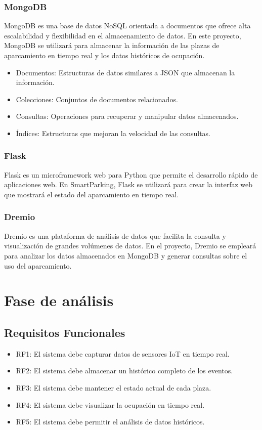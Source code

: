 \documentclass{../../../miPlantilla}
\begin{document}
\subsubsection{MongoDB}
MongoDB es una base de datos NoSQL orientada a documentos que ofrece alta escalabilidad y flexibilidad en el almacenamiento de datos.
En este proyecto, MongoDB se utilizará para almacenar la información de las plazas de aparcamiento en tiempo real y los datos históricos
de ocupación.

\begin{itemize}
  \item Documentos: Estructuras de datos similares a JSON que almacenan la información.
  \item Colecciones: Conjuntos de documentos relacionados.
  \item Consultas: Operaciones para recuperar y manipular datos almacenados.
  \item Índices: Estructuras que mejoran la velocidad de las consultas.
\end{itemize}

\subsubsection{Flask}
Flask es un microframework web para Python que permite el desarrollo rápido de aplicaciones web. En SmartParking, Flask se utilizará para crear
la interfaz web que mostrará el estado del aparcamiento en tiempo real.

\subsubsection{Dremio}
Dremio es una plataforma de análisis de datos que facilita la consulta y visualización de grandes volúmenes de datos. En el proyecto,
Dremio se empleará para analizar los datos almacenados en MongoDB y generar consultas sobre el uso del aparcamiento. 

\newpage

\section{Fase de análisis}
\subsection{Requisitos Funcionales}
\begin{itemize}
  \item RF1: El sistema debe capturar datos de sensores IoT en tiempo real.
  \item RF2: El sistema debe almacenar un histórico completo de los eventos.
  \item RF3: El sistema debe mantener el estado actual de cada plaza.
  \item RF4: El sistema debe visualizar la ocupación en tiempo real.
  \item RF5: El sistema debe permitir el análisis de datos históricos.
\end{itemize}
\end{document}
